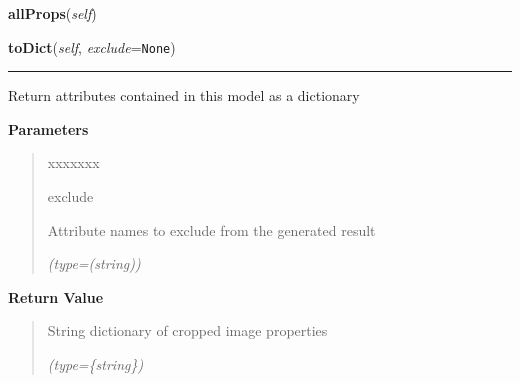    \label{src:dao:model:manual_cropped:manual_cropped:allProps}

    \vspace{0.5ex}

\hspace{.8\funcindent}\begin{boxedminipage}{\funcwidth}

    \raggedright \textbf{allProps}(\textit{self})

\setlength{\parskip}{2ex}
\setlength{\parskip}{1ex}
    \end{boxedminipage}

    \label{src:dao:model:manual_cropped:manual_cropped:toDict}

    \vspace{0.5ex}

\hspace{.8\funcindent}\begin{boxedminipage}{\funcwidth}

    \raggedright \textbf{toDict}(\textit{self}, \textit{exclude}={\tt None})

    \vspace{-1.5ex}

    \rule{\textwidth}{0.5\fboxrule}
\setlength{\parskip}{2ex}
    Return attributes contained in this model as a dictionary

\setlength{\parskip}{1ex}
      \textbf{Parameters}
      \vspace{-1ex}

      \begin{quote}
        \begin{Ventry}{xxxxxxx}

          \item[exclude]

          Attribute names to exclude from the generated result

            {\it (type=(string))}

        \end{Ventry}

      \end{quote}

      \textbf{Return Value}
    \vspace{-1ex}

      \begin{quote}
      String dictionary of cropped image properties

      {\it (type=\{string\})}

      \end{quote}

    \end{boxedminipage}

